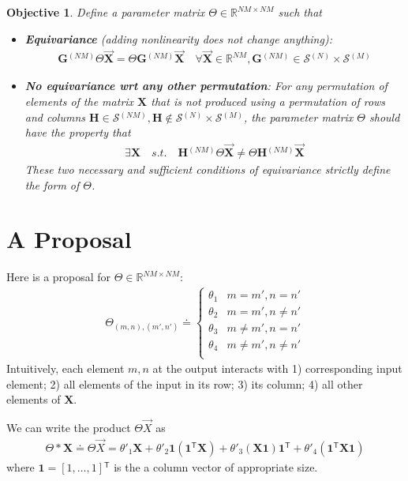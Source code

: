 \documentclass{article}
\newcommand{\defeq}{\ensuremath{\doteq}}
\newcommand{\mat}[1]{\ensuremath{\mathbf{#1}}}
\newcommand{\gr}[1]{\ensuremath{\mathcal{#1}}}
\newcommand{\set}[1]{\ensuremath{\mathbb{#1}}}
\renewcommand{\vec}[1]{\ensuremath{\overrightarrow{#1}}}
\newcommand{\prm}[1]{\ensuremath{^{(#1)}}}
\newcommand{\grn}[2]{\ensuremath{\gr{#1}\prm{#2}}}
\newcommand{\Trp}[0]{\ensuremath{^{\mathsf{T}}}}
\newcommand{\XX}[0]{\ensuremath{\mat{X}}}
\renewcommand{\Re}[0]{\ensuremath{\set{R}}}
\newtheorem{objective}[theorem]{Objective}
\theoremstyle{definition}
\begin{document}
\begin{objective}\label{obj:1}
  Define a parameter matrix $\Theta \in \Re^{ N M \times N M}$ such that
  \begin{itemize}
  \item \textbf{Equivariance} (adding nonlinearity does not change anything):
  \begin{align}
    \mat{G}\prm{N M} \Theta \vec{\XX} = \Theta \mat{G}\prm{N M} \vec{\XX}\quad \forall \vec{\XX} \in \Re^{N M}, \mat{G}\prm{N M} \in \grn{S}{N} \times \grn{S}{M}
  \end{align}
\item \textbf{No equivariance wrt any other permutation}:
  For any permutation of elements of the matrix $\XX$ that is not produced using a permutation of rows and columns $\mat{H} \in \grn{S}{N M}, \mat{H} \notin \grn{S}{N} \times \grn{S}{M}$, the
  parameter matrix $\Theta$ should have the property that
  \begin{align}
   \exists \XX \quad s.t. \quad  \mat{H}\prm{N M} \Theta \vec{\XX} \neq \Theta \mat{H}\prm{N M} \vec{\XX} 
  \end{align}
  These two necessary and sufficient conditions of equivariance strictly define the form of $\Theta$.
\end{itemize}
\end{objective}


\section{A Proposal}
Here is a proposal for $\Theta \in \Re^{NM \times NM}$:
\begin{align}
  \Theta_{(m,n), (m',n')} \defeq
  \begin{cases}
    \theta_1 & m = m', n=n'\\
    \theta_2 & m = m', n \neq n' \\
    \theta_3 & m \neq m', n = n' \\
    \theta_4 & m \neq m', n \neq n' \\
  \end{cases}
\end{align}
Intuitively, each element ${m,n}$ at the output interacts with 1) corresponding input element; 2) all elements of the input in its row; 3) its column; 4) all other elements of $\XX$.

We can write the product $\Theta \vec{X}$ as
\begin{align}\label{eq:param}
  \Theta * \XX \defeq \Theta \vec{X} = \theta'_1 \XX +  \theta'_2 \mat{1} (\mat{1}\Trp \XX) + \theta'_3 (\XX \mat{1})\mat{1}\Trp + \theta'_4 (\mat{1}\Trp \XX \mat{1})
\end{align}
where $\mat{1} = [1,\ldots,1]\Trp$ is the a column vector of appropriate size.
\end{document}
